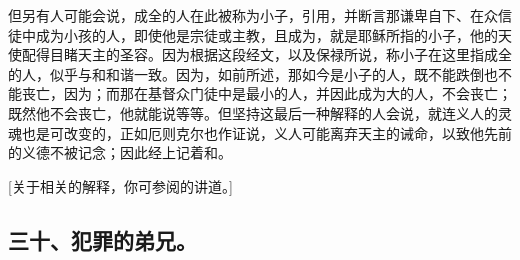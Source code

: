 但另有人可能会说，成全的人在此被称为小子，引用，并断言那谦卑自下、在众信徒中成为小孩的人，即使他是宗徒或主教，且成为，就是耶稣所指的小子，他的天使配得目睹天主的圣容。因为根据这段经文，以及保禄所说，称小子在这里指成全的人，似乎与和和谐一致。因为，如前所述，那如今是小子的人，既不能跌倒也不能丧亡，因为；而那在基督众门徒中是最小的人，并因此成为大的人，不会丧亡；既然他不会丧亡，他就能说等等。但坚持这最后一种解释的人会说，就连义人的灵魂也是可改变的，正如厄则克尔也作证说，义人可能离弃天主的诫命，以致他先前的义德不被记念；因此经上记着和。\par

[关于相关的解释，你可参阅的讲道。]\par


\subsection{三十、犯罪的弟兄。}

